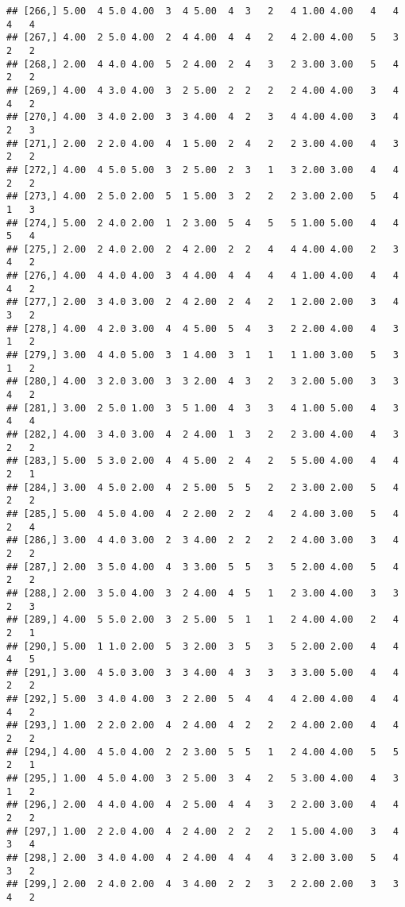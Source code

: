 \documentclass[]{article}
\begin{document}
\begin{verbatim}
## [266,] 5.00  4 5.0 4.00  3  4 5.00  4  3   2   4 1.00 4.00   4   4   4   4
## [267,] 4.00  2 5.0 4.00  2  4 4.00  4  4   2   4 2.00 4.00   5   3   2   2
## [268,] 2.00  4 4.0 4.00  5  2 4.00  2  4   3   2 3.00 3.00   5   4   2   2
## [269,] 4.00  4 3.0 4.00  3  2 5.00  2  2   2   2 4.00 4.00   3   4   4   2
## [270,] 4.00  3 4.0 2.00  3  3 4.00  4  2   3   4 4.00 4.00   3   4   2   3
## [271,] 2.00  2 2.0 4.00  4  1 5.00  2  4   2   2 3.00 4.00   4   3   2   2
## [272,] 4.00  4 5.0 5.00  3  2 5.00  2  3   1   3 2.00 3.00   4   4   2   2
## [273,] 4.00  2 5.0 2.00  5  1 5.00  3  2   2   2 3.00 2.00   5   4   1   3
## [274,] 5.00  2 4.0 2.00  1  2 3.00  5  4   5   5 1.00 5.00   4   4   5   4
## [275,] 2.00  2 4.0 2.00  2  4 2.00  2  2   4   4 4.00 4.00   2   3   4   2
## [276,] 4.00  4 4.0 4.00  3  4 4.00  4  4   4   4 1.00 4.00   4   4   4   2
## [277,] 2.00  3 4.0 3.00  2  4 2.00  2  4   2   1 2.00 2.00   3   4   3   2
## [278,] 4.00  4 2.0 3.00  4  4 5.00  5  4   3   2 2.00 4.00   4   3   1   2
## [279,] 3.00  4 4.0 5.00  3  1 4.00  3  1   1   1 1.00 3.00   5   3   1   2
## [280,] 4.00  3 2.0 3.00  3  3 2.00  4  3   2   3 2.00 5.00   3   3   4   2
## [281,] 3.00  2 5.0 1.00  3  5 1.00  4  3   3   4 1.00 5.00   4   3   4   4
## [282,] 4.00  3 4.0 3.00  4  2 4.00  1  3   2   2 3.00 4.00   4   3   2   2
## [283,] 5.00  5 3.0 2.00  4  4 5.00  2  4   2   5 5.00 4.00   4   4   2   1
## [284,] 3.00  4 5.0 2.00  4  2 5.00  5  5   2   2 3.00 2.00   5   4   2   2
## [285,] 5.00  4 5.0 4.00  4  2 2.00  2  2   4   2 4.00 3.00   5   4   2   4
## [286,] 3.00  4 4.0 3.00  2  3 4.00  2  2   2   2 4.00 3.00   3   4   2   2
## [287,] 2.00  3 5.0 4.00  4  3 3.00  5  5   3   5 2.00 4.00   5   4   2   2
## [288,] 2.00  3 5.0 4.00  3  2 4.00  4  5   1   2 3.00 4.00   3   3   2   3
## [289,] 4.00  5 5.0 2.00  3  2 5.00  5  1   1   2 4.00 4.00   2   4   2   1
## [290,] 5.00  1 1.0 2.00  5  3 2.00  3  5   3   5 2.00 2.00   4   4   4   5
## [291,] 3.00  4 5.0 3.00  3  3 4.00  4  3   3   3 3.00 5.00   4   4   2   2
## [292,] 5.00  3 4.0 4.00  3  2 2.00  5  4   4   4 2.00 4.00   4   4   4   2
## [293,] 1.00  2 2.0 2.00  4  2 4.00  4  2   2   2 4.00 2.00   4   4   2   2
## [294,] 4.00  4 5.0 4.00  2  2 3.00  5  5   1   2 4.00 4.00   5   5   2   1
## [295,] 1.00  4 5.0 4.00  3  2 5.00  3  4   2   5 3.00 4.00   4   3   1   2
## [296,] 2.00  4 4.0 4.00  4  2 5.00  4  4   3   2 2.00 3.00   4   4   2   2
## [297,] 1.00  2 2.0 4.00  4  2 4.00  2  2   2   1 5.00 4.00   3   4   3   4
## [298,] 2.00  3 4.0 4.00  4  2 4.00  4  4   4   3 2.00 3.00   5   4   3   2
## [299,] 2.00  2 4.0 2.00  4  3 4.00  2  2   3   2 2.00 2.00   3   3   4   2

\end{verbatim}
\end{document}
